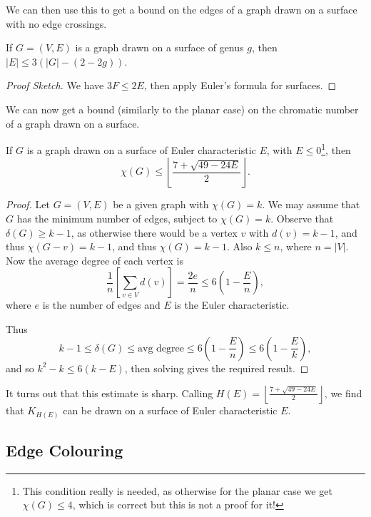 We can then use this to get a bound on the edges of a graph drawn on a surface with no edge crossings.

\begin{proposition}
	If $G = (V, E)$ is a graph drawn on a surface of genus $g$, then $|E| \leq 3(|G| - (2 - 2g))$.
\end{proposition}
\begin{proof}[Proof Sketch]
	We have $3F \leq 2E$, then apply Euler's formula for surfaces.
\end{proof}

We can now get a bound (similarly to the planar case) on the chromatic number of a graph drawn on a surface.

\begin{theorem}
	If $G$ is a graph drawn on a surface of Euler characteristic $E$, with $E \leq 0$\footnote{This condition really is needed, as otherwise for the planar case we get $\chi(G) \leq 4$, which is correct but this is not a proof for it!}, then
	$$
	\chi(G) \leq \left\lfloor \frac{7 + \sqrt{49 - 24E}}{2}\right\rfloor.
	$$
\end{theorem}
\begin{proof}
	Let $G = (V, E)$ be a given graph with $\chi(G) = k$. We may assume that $G$ has the minimum number of edges, subject to $\chi(G) = k$.
	Observe that $\delta(G) \geq k - 1$, as otherwise there would be a vertex $v$ with $d(v) = k - 1$, and thus $\chi(G - v) = k - 1$, and thus $\chi(G) = k - 1$. Also $k \leq n$, where $n = |V|$. Now the average degree of each vertex is
	$$
	\frac{1}{n} \left[\sum_{v \in V}d(v)\right] = \frac{2e}{n} \leq 6\left(1 - \frac{E}{n}\right),
	$$
	where $e$ is the number of edges and $E$ is the Euler characteristic.

	Thus
	$$
	k - 1 \leq \delta(G) \leq \text{avg degree} \leq 6\left(1 - \frac{E}{n}\right) \leq 6\left(1 - \frac{E}{k}\right),
	$$
	and so $k^2 - k \leq 6(k - E)$, then solving gives the required result.
\end{proof}

\begin{remark}
	It turns out that this estimate is sharp. Calling $H(E) = \left\lfloor \frac{7 + \sqrt{49 - 24E}}{2}\right\rfloor$, we find that $K_{H(E)}$ can be drawn on a surface of Euler characteristic $E$.
\end{remark}

\subsection{Edge Colouring}

